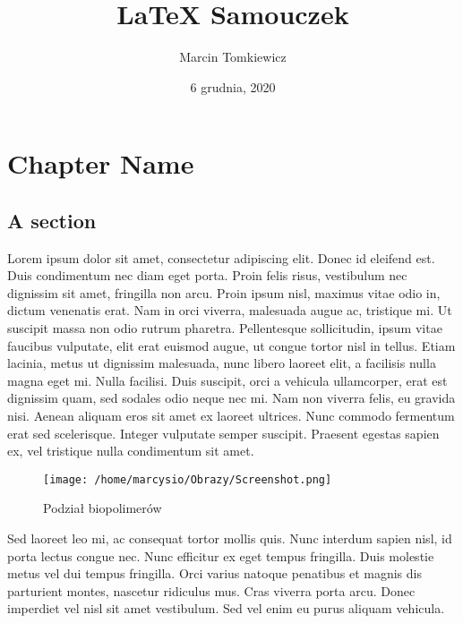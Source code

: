 \documentclass[a4paper,10pt]{book}
\begin{document}
\title{\Large{\textbf{LaTeX Samouczek}}}
\author{Marcin Tomkiewicz}
\date{6 grudnia, 2020}

\maketitle
\let\cleardoublepage\clearpage
\tableofcontents

\setcounter{page}{2}
\fancyhf{}
\renewcommand{\headrulewidth}{2pt}
\renewcommand{\footrulewidth}{1pt}
\fancyhead[LE]{\leftmark}
\fancyhead[RO]{\nouppercase{\rightmark}}
\fancyfoot[LE,RO]{\thepage}

\chapter{Chapter Name}

\section{A section}

Lorem ipsum dolor sit amet, consectetur adipiscing elit. Donec id eleifend est. Duis condimentum nec diam eget porta. Proin felis risus, vestibulum nec dignissim sit amet, fringilla non arcu. Proin ipsum nisl, maximus vitae odio in, dictum venenatis erat. Nam in orci viverra, malesuada augue ac, tristique mi. Ut suscipit massa non odio rutrum pharetra. Pellentesque sollicitudin, ipsum vitae faucibus vulputate, elit erat euismod augue, ut congue tortor nisl in tellus. Etiam lacinia, metus ut dignissim malesuada, nunc libero laoreet elit, a facilisis nulla magna eget mi. Nulla facilisi. Duis suscipit, orci a vehicula ullamcorper, erat est dignissim quam, sed sodales odio neque nec mi. Nam non viverra felis, eu gravida nisi. Aenean aliquam eros sit amet ex laoreet ultrices. Nunc commodo fermentum erat sed scelerisque. Integer vulputate semper suscipit. Praesent egestas sapien ex, vel tristique nulla condimentum sit amet. 

\begin{figure}[ht]

\centering

\texttt{[image: /home/marcysio/Obrazy/Screenshot.png]}
\caption{Podział biopolimerów}\label{Rys:podział biopolimerów}

\end{figure}

Sed laoreet leo mi, ac consequat tortor mollis quis. Nunc interdum sapien nisl, id porta lectus congue nec. Nunc efficitur ex eget tempus fringilla. Duis molestie metus vel dui tempus fringilla. Orci varius natoque penatibus et magnis dis parturient montes, nascetur ridiculus mus. Cras viverra porta arcu. Donec imperdiet vel nisl sit amet vestibulum. Sed vel enim eu purus aliquam vehicula. 
\end{document}
